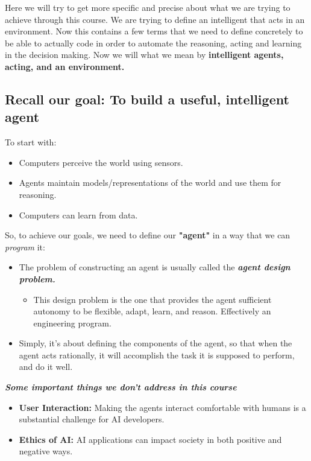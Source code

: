 \documentclass[12pt]{article}
\begin{document}
Here we will try to get more specific and precise about what we are trying to achieve through this course. 
\newline We are trying to define an intelligent that acts in an environment. Now this contains a few terms that we need to define concretely to be able to actually code in order to automate the reasoning, acting and learning in the decision making.
Now we will what we mean by \textbf{intelligent agents, acting, and an environment.}

\subsection{Recall our goal: To build a useful, intelligent agent}
To start with:
\begin{itemize}
    \item Computers perceive the world using sensors.
    \item Agents maintain models/representations of the world and use them for reasoning. 
    \item Computers can learn from data.
\end{itemize}

\noindent So, to achieve our goals, we need to define our \textbf{"agent"} in a way that we can \emph{program} it:
\begin{itemize}
    \item The problem of constructing an agent is usually called the \textbf{\emph{agent design problem.}}
    \begin{itemize}
        \item This design problem is the one that provides the agent sufficient autonomy to be flexible, adapt, learn, and reason. Effectively an engineering program.
    \end{itemize}
    \item Simply, it's about defining the components of the agent, so that when the agent acts rationally, it will accomplish the task it is supposed to perform, and do it well.
\end{itemize}

\noindent \textbf{\emph{Some important things we don't address in this course}}
\begin{itemize}
    \item \textbf{User Interaction:} Making the agents interact comfortable with humans is a substantial challenge for AI developers.
    \item \textbf{Ethics of AI:} AI applications can impact society in both positive and negative ways.
\end{itemize}
\end{document}
